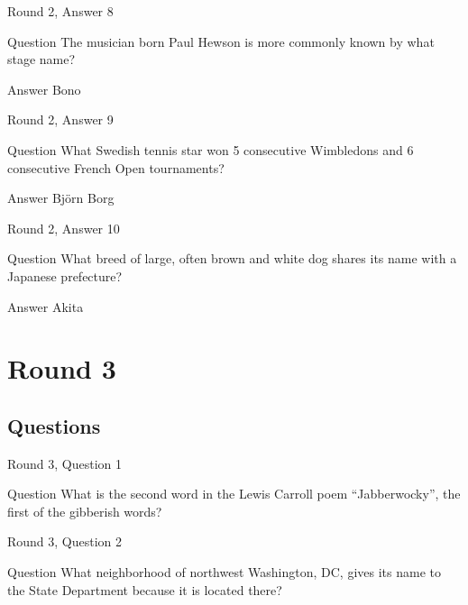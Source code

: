 \documentclass[11pt]{beamer}
\begin{document}
\begin{frame}{Round 2, Answer 8}
\begin{block}{Question}
The musician born Paul Hewson is more commonly known by what stage name\@?
\end{block}
\pause{}
\begin{block}{Answer}
Bono
\end{block}
\end{frame}
    

\begin{frame}{Round 2, Answer 9}
\begin{block}{Question}
What Swedish tennis star won 5 consecutive Wimbledons and 6 consecutive French Open tournaments\@?
\end{block}
\pause{}
\begin{block}{Answer}
Björn Borg
\end{block}
\end{frame}
    

\begin{frame}{Round 2, Answer 10}
\begin{block}{Question}
What breed of large, often brown and white dog shares its name with a Japanese prefecture\@?
\end{block}
\pause{}
\begin{block}{Answer}
Akita
\end{block}
\end{frame}
    

\section{Round 3}
    
\subsection{Questions}

\begin{frame}{Round 3, Question 1}
\begin{block}{Question}
What is the second word in the Lewis Carroll poem ``Jabberwocky'', the first of the gibberish words\@?
\end{block}
\end{frame}
    

\begin{frame}{Round 3, Question 2}
\begin{block}{Question}
What neighborhood of northwest Washington, DC, gives its name to the State Department because it is located there\@?
\end{block}
\end{frame}
    
\end{document}
